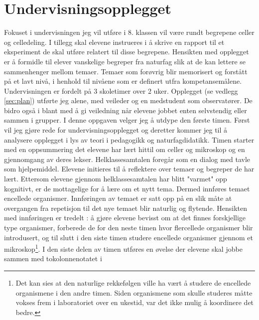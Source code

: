 \documentclass[main.tex]{subfiles}
\begin{document}
\section*{Undervisningsopplegget}
\label{sec:1}
Fokuset i undervisningen jeg vil utføre i 8. klassen vil være rundt begrepene celler og celledeling. 
I tillegg skal elevene instrueres i å skrive en rapport til et eksperiment de skal utføre relatert 
til disse begrepene. Hensikten med opplegget er å formidle til elever vanskelige begreper fra 
naturfag slik at de kan lettere se sammenhenger mellom temaer. Temaer som forøvrig blir memorisert 
og forstått på et lavt nivå, i henhold til nivåene som er definert utfra kompetansemålene. 
\newline
\newline
Undervisningen er fordelt på 3 skoletimer over 2 uker. Opplegget (se vedlegg \ref{sec:plan}) 
utførte jeg alene, med veileder og en medstudent som observatører. De bidro også i blant 
med å gi veiledning når elevene jobbet enten selvstendig eller sammen i grupper. I denne 
oppgaven velger jeg å utdype den første timen. Først vil jeg gjøre rede for undervisningsopplegget 
og deretter kommer jeg til å analysere opplegget i lys av teori i pedagogikk og naturfagdidatikk.
\newline
\newline
Timen starter med en oppsummering det elevene har lært hittil om celler og mikroskop og en 
gjennomgang av deres lekser. Helklassesamtalen foregår som en dialog med tavle som hjelpemiddel. 
Elevene initieres til å reflektere over temaer og begreper de har lært. Ettersom elevene gjennom 
helklassesamtalen har blitt "varmet" opp kognitivt, er de mottagelige for å lære om et nytt tema. 
Dermed innføres temaet encellede organismer. Innføringen av temaet er satt opp på en slik 
måte at overgangen fra repetisjon til det nye temaet blir naturlig og flytende. Hensikten med 
innføringen er tredelt : å gjøre elevene bevisst om at det finnes forskjellige 
type organismer, forberede de for den neste timen hvor flercellede organismer blir introdusert, og 
til slutt i den siste timen studere encellede organismer gjennom et mikroskop\footnote{Det kan sies 
at den naturlige rekkefølgen ville ha vært å studere de encellede organismene i den andre timen. 
Siden organismene som skulle studeres måtte vokses frem i laboratoriet over en ukestid, var det ikke 
mulig å koordinere det bedre.}.
\newline
\newline
I den siste delen av timen utføres en øvelse der elevene skal jobbe sammen med tokolonnenotatet i 
\end{document}
